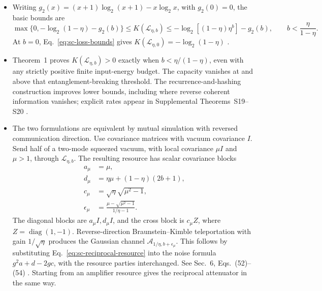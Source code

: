 \begin{itemize}
  \item Writing $g_2(x)=(x+1)\log_2(x+1)-x\log_2x$, with $g_2(0)=0$, the basic bounds are
\begin{equation}
 \max\{0,-\log_2(1-\eta)-g_2(b)\}\leq K(\mathcal L_{\eta,b})
 \leq-\log_2[(1-\eta)\eta^b]-g_2(b),\qquad b<\frac\eta{1-\eta}.
 \label{eq:sc-loss-bounds}
\end{equation}
At $b=0$, Eq.~\eqref{eq:sc-loss-bounds} gives $K(\mathcal L_{\eta,0})=-\log_2(1-\eta)$ .

  \item Theorem~1 proves $K(\mathcal L_{\eta,b})>0$ exactly when $b<\eta/(1-\eta)$, even with any strictly positive finite input-energy budget. The capacity vanishes at and above that entanglement-breaking threshold. The recurrence-and-hashing construction improves lower bounds, including where reverse coherent information vanishes; explicit rates appear in Supplemental Theorems~S19--S20 .

  \item The two formulations are equivalent by mutual simulation with reversed communication direction. Use covariance matrices with vacuum covariance $I$. Send half of a two-mode squeezed vacuum, with local covariance $\mu I$ and $\mu>1$, through $\mathcal L_{\eta,b}$. The resulting resource has scalar covariance blocks
\begin{equation}
\begin{aligned}
 a_\mu&=\mu,\\
 d_\mu&=\eta\mu+(1-\eta)(2b+1),\\
 c_\mu&=\sqrt\eta\sqrt{\mu^2-1},\\
 \epsilon_\mu&=\frac{\mu-\sqrt{\mu^2-1}}{1/\eta-1}.
\end{aligned}
\label{eq:sc-reciprocal-resource}
\end{equation}
The diagonal blocks are $a_\mu I,d_\mu I$, and the cross block is $c_\mu Z$, where $Z=\operatorname{diag}(1,-1)$. Reverse-direction Braunstein--Kimble teleportation with gain $1/\sqrt\eta$ produces the Gaussian channel $\mathcal A_{1/\eta,b+\epsilon_\mu}$. This follows by substituting Eq.~\eqref{eq:sc-reciprocal-resource} into the noise formula $g^2a+d-2gc$, with the resource parties interchanged. See Sec.~6, Eqs.~(52)--(54) . Starting from an amplifier resource gives the reciprocal attenuator in the same way.


\end{itemize}
